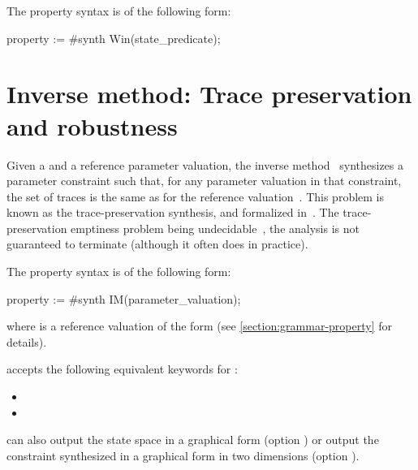 The property syntax is of the following form:

\begin{IMITATORproperty}
property := #synth Win(state_predicate);
\end{IMITATORproperty}



\section{Inverse method: Trace preservation and robustness}\label{section:algorithm:IM}

Given a \NIPTA{} and a reference parameter valuation, the inverse method~\IM{} synthesizes a parameter constraint such that, for any parameter valuation in that constraint, the set of traces is the same as for the reference valuation~\cite{ACEF09}.
This problem is known as the trace-preservation synthesis, and formalized in~\cite{ALM20}.
The trace-preservation emptiness problem being undecidable~\cite{ALM20}, the analysis is not guaranteed to terminate (although it often does in practice).

The property syntax is of the following form:

\begin{IMITATORproperty}
property := #synth IM(parameter_valuation);
\end{IMITATORproperty}

\noindent{}
where  is a reference valuation of the form  (see \cref{section:grammar-property} for details).

\begin{syntaxalias}
	\imitator{} accepts the following equivalent keywords for :
	\begin{itemize}
		\item {}
		\item {}
	\end{itemize}
\end{syntaxalias}


\imitator{} can also output the state space in a graphical form (option )
or
output the constraint synthesized in a graphical form in two dimensions (option ).

